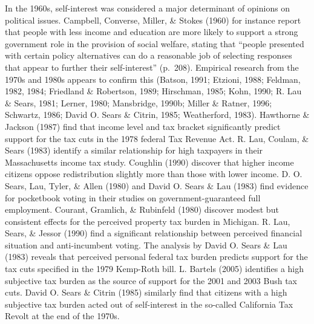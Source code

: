 \documentclass[12pt,econ]{sources/authesis}
\begin{document}
In the 1960s, self-interest was considered a major determinant of opinions on political issues. Campbell, Converse, Miller, \& Stokes (1960) for instance report that people with less income and education are more likely to support a strong government role in the provision of social welfare, stating that ``people presented with certain policy alternatives can do a reasonable job of selecting responses that appear to further their self-interest'' (p.~208). Empirical research from the 1970s and 1980s appears to confirm this (Batson, 1991; Etzioni, 1988; Feldman, 1982, 1984; Friedland \& Robertson, 1989; Hirschman, 1985; Kohn, 1990; R. Lau \& Sears, 1981; Lerner, 1980; Mansbridge, 1990b; Miller \& Ratner, 1996; Schwartz, 1986; David O. Sears \& Citrin, 1985; Weatherford, 1983). Hawthorne \& Jackson (1987) find that income level and tax bracket significantly predict support for the tax cuts in the 1978 federal Tax Revenue Act. R. Lau, Coulam, \& Sears (1983) identify a similar relationship for high taxpayers in their Massachusetts income tax study. Coughlin (1990) discover that higher income citizens oppose redistribution slightly more than those with lower income. D. O. Sears, Lau, Tyler, \& Allen (1980) and David O. Sears \& Lau (1983) find evidence for pocketbook voting in their studies on government-guaranteed full employment. Courant, Gramlich, \& Rubinfeld (1980) discover modest but consistent effects for the perceived property tax burden in Michigan. R. Lau, Sears, \& Jessor (1990) find a significant relationship between perceived financial situation and anti-incumbent voting. The analysis by David O. Sears \& Lau (1983) reveals that perceived personal federal tax burden predicts support for the tax cuts specified in the 1979 Kemp-Roth bill. L. Bartels (2005) identifies a high subjective tax burden as the source of support for the 2001 and 2003 Bush tax cuts. David O. Sears \& Citrin (1985) similarly find that citizens with a high subjective tax burden acted out of self-interest in the so-called California Tax Revolt at the end of the 1970s.
\end{document}
